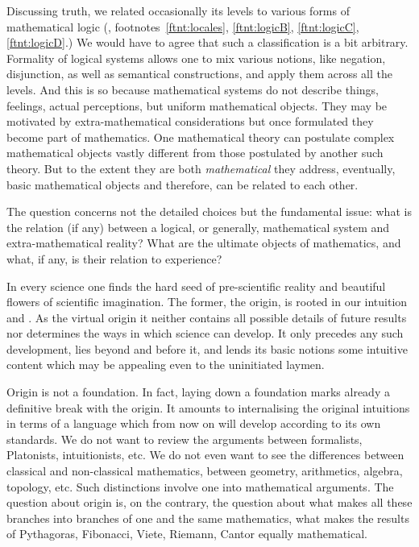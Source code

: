 Discussing truth, %
we related occasionally its levels to various forms of mathematical logic
(, footnotes~\ref{ftnt:locales}, \ref{ftnt:logicB},
\ref{ftnt:logicC}, \ref{ftnt:logicD}.) We
would have to agree that such a {classification} is a bit arbitrary.  Formality
of logical systems allows one to mix various
notions, like negation, disjunction, as well as semantical constructions, and
apply them across all the levels.  And this is so because mathematical systems
do not describe things, feelings, actual perceptions, but uniform mathematical
objects. They may be motivated by extra-mathematical considerations but once
formulated they become part of mathematics. One mathematical theory can
postulate complex mathematical objects vastly different from those
postulated by another such theory.
But to the extent they are both {\em mathematical} they address, eventually, basic
mathematical objects and therefore, can be related to each other.

The question concerns not the detailed choices but the fundamental issue: what
is the relation (if any) between a logical, or generally, mathematical system
and extra-mathematical reality?  What are the ultimate objects of mathematics,
and what, if any, is their relation to experience?



\pa
In every science one finds the hard seed of pre-scientific reality and 
beautiful flowers of scientific imagination. The former, the origin, 
is rooted in our intuition and . As the virtual origin it 
neither contains all possible details of future results nor 
determines the ways in which science can develop. It only precedes any 
such development, lies beyond and before it, and lends its basic notions 
some intuitive content which may be appealing even to the uninitiated 
laymen.%

Origin is not a foundation. In fact, laying down a foundation marks 
already a definitive break with the origin. It amounts to 
internalising the original intuitions in terms of a language which 
from now on will develop according to its own standards. We do not want 
to review the arguments between formalists, Platonists, intuitionists, 
etc. We do not even want to see the differences between classical and 
non-classical mathematics, between geometry, 
arithmetics, algebra, topology, etc. Such distinctions involve one 
into mathematical arguments. The question about origin is, on the 
contrary, the question about what makes all these branches into 
branches of one and the same mathematics, what 
makes the results of Pythagoras, Fibonacci, Viete, Riemann, Cantor
equally mathematical.


